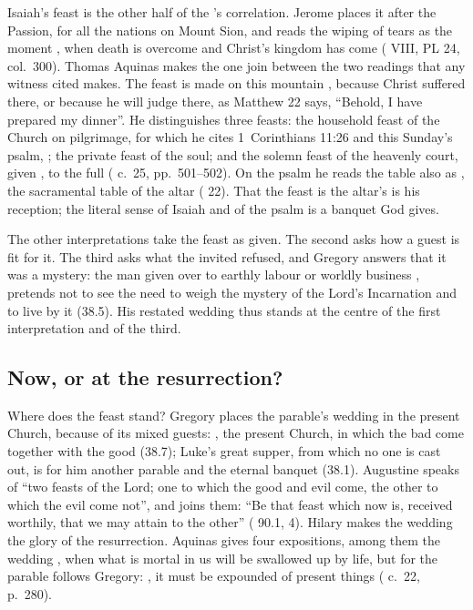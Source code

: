 Isaiah's feast is the other half of the 's correlation. Jerome
places it after the Passion, for all the nations on Mount Sion, and reads the
wiping of tears as the moment , when death is overcome and Christ's kingdom has come
( VIII, PL 24, col.~300). Thomas Aquinas makes the
one join between the two readings that any witness cited makes. The feast is
made on this mountain , because Christ
suffered there, or because he will judge there, as Matthew 22 says, ``Behold, I
have prepared my dinner''. He distinguishes three feasts: the household feast
of the Church on pilgrimage, for which he cites 1~Corinthians 11:26 and this
Sunday's psalm, ; the private feast of
the soul; and the solemn feast of the heavenly court, given , to the full ( c.~25,
pp.~501--502). On the psalm he reads the table also as
, the sacramental table of the
altar ( 22). That the feast is the altar's is his
reception; the literal sense of Isaiah and of the psalm is a banquet God
gives.

The other interpretations take the feast as given. The second asks how a guest
is fit for it. The third asks what the invited refused, and Gregory answers
that it was a mystery: the man given over to earthly labour or worldly
business , pretends not to see the need to weigh the mystery of the
Lord's Incarnation and to live by it (38.5). His restated wedding thus stands
at the centre of the first interpretation and of the third.

\subsection{Now, or at the resurrection?}

Where does the feast stand? Gregory places the parable's wedding in the
present Church, because of its mixed guests: , the present
Church, in which the bad come together with the good (38.7); Luke's great
supper, from which no one is cast out, is for him another parable and the
eternal banquet (38.1). Augustine speaks of ``two feasts of the Lord; one to
which the good and evil come, the other to which the evil come not'', and joins
them: ``Be that feast which now is, received worthily, that we may attain to
the other'' ( 90.1, 4). Hilary makes the wedding the glory of the
resurrection. Aquinas gives four expositions, among them the wedding
, when what is mortal in us will be swallowed
up by life, but for the parable follows Gregory: , it must be expounded of present things
( c.~22, p.~280).

